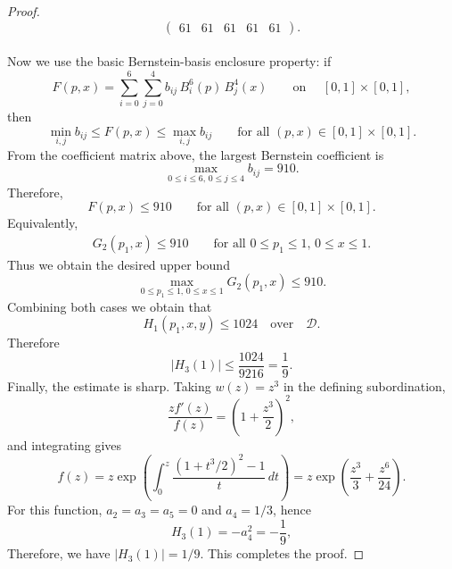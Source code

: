 \documentclass[10pt,a4paper]{amsart}
\begin{document}
\begin{proof}
\[\begin{pmatrix}
	61 & 61 & 61 & 61 & 61
\end{pmatrix}.
\]\\
Now we use the basic Bernstein-basis enclosure property: if
\[
F(p,x)=\sum_{i=0}^{6}\sum_{j=0}^{4} b_{ij}\,B_i^6(p)\,B_j^4(x)
\qquad \text{on }\quad  [0,1]\times[0, 1],
\]
then
\[
\min_{i,j} b_{ij}\le F(p,x)\le \max_{i,j} b_{ij}
\qquad \text{for all } (p,x)\in[0,1]\times[0, 1].
\]
From the coefficient matrix above, the largest Bernstein coefficient is
\[
\max_{0\le i\le 6,\,0\le j\le 4} b_{ij}=910.
\]
Therefore,
\[
F(p,x)\le 910
\qquad \text{for all } (p,x)\in[0,1]\times[0, 1].
\]
Equivalently,
\begin{align*}
	G_2(p_1,x)\le 910
	\qquad \text{for all } 0\le p_1\le 1,\,0\le x\le 1.
\end{align*}
Thus we obtain the desired upper bound
\[
\max_{0\le p_1\le 1,\,0\le x\le 1} G_2(p_1,x)\le 910.
\]
Combining both cases we obtain that 
\[
H_{1}(p_1, x, y)\le 1024 \quad \text{over} \quad \mathcal{D}.
\]
Therefore 
\[
|H_{3}(1)|\le \frac{1024}{9216}=\frac{1}{9}.
\]
Finally, the estimate is sharp. Taking $w(z)=z^3$ in the defining subordination,
\[
\frac{z f'(z)}{f(z)}=\left(1+\frac{z^3}{2}\right)^2,
\]
and integrating gives
\[
f(z)=z\exp\!\left(\int_0^z \frac{(1+t^3/2)^2-1}{t}\,dt\right)
=z\exp\!\left(\frac{z^3}{3}+\frac{z^6}{24}\right).
\]
For this function, $a_2=a_3=a_5=0$ and $a_4=1/3$, hence
\[
H_3(1)=-a_4^2=-\frac19,
\]
Therefore, we have $|H_3(1)|=1/9$. This completes the proof.
\end{proof}
\end{document}
